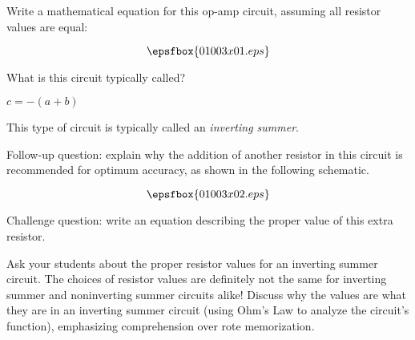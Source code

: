 

Write a mathematical equation for this op-amp circuit, assuming all resistor values are equal:

$$\epsfbox{01003x01.eps}$$

What is this circuit typically called?







$c = -(a + b)$

\vskip 10pt

This type of circuit is typically called an {\it inverting summer}.

\vskip 10pt

Follow-up question: explain why the addition of another resistor in this circuit is recommended for optimum accuracy, as shown in the following schematic.

$$\epsfbox{01003x02.eps}$$

Challenge question: write an equation describing the proper value of this extra resistor.







Ask your students about the proper resistor values for an inverting summer circuit.  The choices of resistor values are definitely not the same for inverting summer and noninverting summer circuits alike!  Discuss why the values are what they are in an inverting summer circuit (using Ohm's Law to analyze the circuit's function), emphasizing comprehension over rote memorization.




